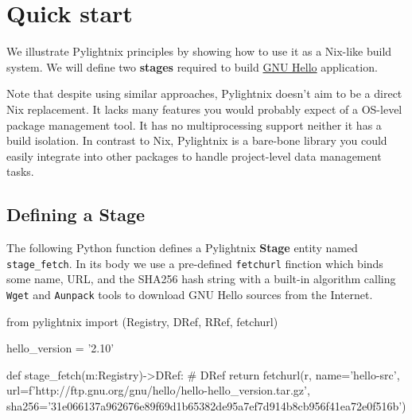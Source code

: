 \section{Quick start}

We illustrate Pylightnix principles by showing how to use it as a Nix-like build
system. We will define two \textbf{stages} required to build
\href{https://www.gnu.org/software/hello/}{GNU Hello} application.

Note that despite using similar approaches, Pylightnix doesn't aim to be a
direct Nix replacement. It lacks many features you would probably expect of a
OS-level package management tool. It has no multiprocessing support neither it
has a build isolation. In contrast to Nix, Pylightnix is a bare-bone library you
could easily integrate into other packages to handle project-level data
management tasks.

\subsection{Defining a Stage}

The following Python function defines a Pylightnix \textbf{Stage} entity named
\texttt{stage\_fetch}. In its body we use a pre-defined \texttt{fetchurl}
finction which binds some name, URL, and the SHA256 hash string with a built-in
algorithm calling \texttt{Wget} and \texttt{Aunpack} tools to download GNU Hello
sources from the Internet.

\begin{pythontexcode}
from pylightnix import (Registry, DRef, RRef, fetchurl)

hello_version = '2.10'

def stage_fetch(m:Registry)->DRef: # DRef \label{DREF}
  return fetchurl(r,
    name='hello-src',
    url=f'http://ftp.gnu.org/gnu/hello/hello-{hello_version}.tar.gz',
    sha256='31e066137a962676e89f69d1b65382de95a7ef7d914b8cb956f41ea72e0f516b')
\end{pythontexcode}


